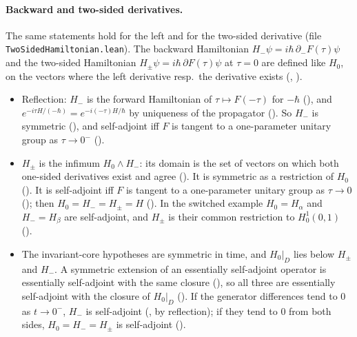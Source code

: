 \documentclass[11pt]{article}
\begin{document}
\paragraph{Backward and two-sided derivatives.} The same statements hold for the left and for the
two-sided derivative (file \texttt{TwoSidedHamiltonian.lean}). The backward Hamiltonian
$H_-\psi = i\hbar\,\partial_-F(\tau)\psi$ and the two-sided Hamiltonian
$H_\pm\psi = i\hbar\,\partial F(\tau)\psi$ at $\tau = 0$ are defined like $H_0$, on the vectors
where the left derivative resp.\ the derivative exists (,
).
\begin{itemize}
\item Reflection: $H_-$ is the forward Hamiltonian of $\tau \mapsto F(-\tau)$ for $-\hbar$
  (), and
  $e^{-i\tau H/(-\hbar)} = e^{-i(-\tau)H/\hbar}$ by uniqueness of the propagator
  (). So $H_-$ is symmetric
  (), and self-adjoint iff $F$ is tangent to a
  one-parameter unitary group as $\tau \to 0^-$ ().
\item $H_\pm$ is the infimum $H_0 \wedge H_-$: its domain is the set of vectors on which both
  one-sided derivatives exist and agree (). It is symmetric as a
  restriction of $H_0$ (). It is self-adjoint iff $F$ is
  tangent to a one-parameter unitary group as $\tau \to 0$
  (); then $H_0 = H_- = H_\pm = H$
  (). In the switched example $H_0 = H_\alpha$ and
  $H_- = H_\beta$ are self-adjoint, and $H_\pm$ is their common restriction to $H^1_0(0,1)$
  ().
\item The invariant-core hypotheses are symmetric in time, and $H_0|_D$ lies below $H_\pm$ and
  $H_-$. A symmetric extension of an essentially self-adjoint operator is essentially
  self-adjoint with the same closure (), so all three are
  essentially self-adjoint with the closure of $H_0|_D$
  (). If the generator differences tend to
  $0$ as $t \to 0^-$, $H_-$ is self-adjoint (, by
  reflection); if they tend to $0$ from both sides, $H_0 = H_- = H_\pm$ is self-adjoint
  ().
\end{itemize}
\end{document}
